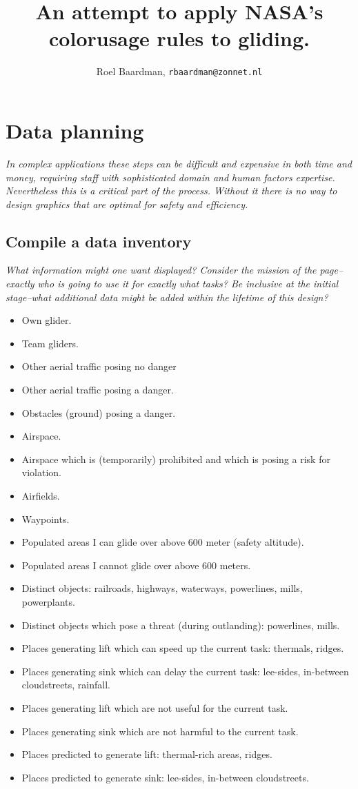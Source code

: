 \documentclass{article}
\newcommand{\myquote}[1]
{
	\textit{#1}
}
\begin{document}
\title{An attempt to apply NASA's colorusage rules to gliding.}
\author{Roel Baardman, \nolinkurl{rbaardman@zonnet.nl}}
\maketitle
\newpage
\tableofcontents
\newpage

\section{Data planning}
\myquote{In complex applications these steps can be difficult and expensive in both time and money, requiring staff with sophisticated domain and human factors expertise. Nevertheless this is a critical part of the process. Without it there is no way to design graphics that are optimal for safety and efficiency.}
\subsection{Compile a data inventory}
\myquote{What information might one want displayed? Consider the mission of the page--exactly who is going to use it for exactly what tasks? Be inclusive at the initial stage--what additional data might be added within the lifetime of this design?}
\begin{itemize}
\item Own glider.
\item Team gliders.
\item Other aerial traffic posing no danger
\item Other aerial traffic posing a danger.
\item Obstacles (ground) posing a danger.
\item Airspace.
\item Airspace which is (temporarily) prohibited and which is posing a risk for violation.
\item Airfields.
\item Waypoints.
\item Populated areas I can glide over above 600 meter (safety altitude).
\item Populated areas I cannot glide over above 600 meters.
\item Distinct objects: railroads, highways, waterways, powerlines, mills, powerplants.
\item Distinct objects which pose a threat (during outlanding): powerlines, mills.
\item Places generating lift which can speed up the current task: thermals, ridges.
\item Places generating sink which can delay the current task: lee-sides, in-between cloudstreets, rainfall.
\item Places generating lift which are not useful for the current task.
\item Places generating sink which are not harmful to the current task.
\item Places predicted to generate lift: thermal-rich areas, ridges.
\item Places predicted to generate sink: lee-sides, in-between cloudstreets.
\end{itemize}
\end{document}
